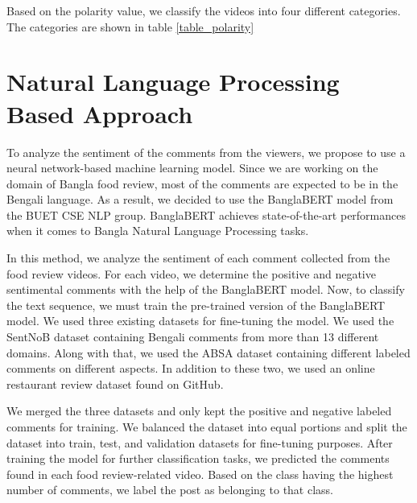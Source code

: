Based on the polarity value, we classify the videos into four different categories. The categories are shown in table \ref{table_polarity}



\section{Natural Language Processing Based Approach}
To analyze the sentiment of the comments from the viewers, we propose to use a neural network-based machine learning model. Since we are working on the domain of Bangla food review, most of the comments are expected to be in the Bengali language. As a result, we decided to use the BanglaBERT \cite{banglabert} model from the BUET CSE NLP group. BanglaBERT achieves state-of-the-art performances when it comes to Bangla Natural Language Processing tasks.

In this method, we analyze the sentiment of each comment collected from the food review videos. For each video, we determine the positive and negative sentimental comments with the help of the BanglaBERT model. Now, to classify the text sequence, we must train the pre-trained version of the BanglaBERT model. We used three existing datasets for fine-tuning the model. We used the SentNoB dataset\cite{dataset_sentnob} containing Bengali comments from more than 13 different domains. Along with that, we used the ABSA dataset\cite{dataset_absa} containing different labeled comments on different aspects. In addition to these two, we used an online restaurant review dataset found on GitHub\cite{dataset_restaurant}.

We merged the three datasets and only kept the positive and negative labeled comments for training. We balanced the dataset into equal portions and split the dataset into train, test, and validation datasets for fine-tuning purposes. After training the model for further classification tasks, we predicted the comments found in each food review-related video. Based on the class having the highest number of comments, we label the post as belonging to that class.


